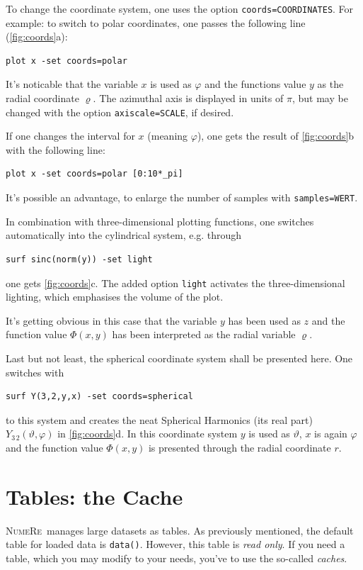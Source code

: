 \documentclass[DIV=14,headsepline,footsepline]{scrbook}
\newcommand{\NR}{\textsc{Nu\-me\-Re}}
\begin{document}
				To change the coordinate system, one uses the option \verb+coords=COORDINATES+. For example: to switch to polar coordinates, one passes the following line (\autoref{fig:coords}a):
				\begin{lstlisting}
plot x -set coords=polar
				\end{lstlisting}
				
				It's noticable that the variable $x$ is used as $\varphi$ and the functions value $y$ as the radial coordinate $\varrho$. The azimuthal axis is displayed in units of $\pi$, but may be changed with the option \verb+axiscale=SCALE+, if desired. 
				
				If one changes the interval for $x$ (meaning $\varphi$), one gets the result of \autoref{fig:coords}b with the following line:
				\begin{lstlisting}
plot x -set coords=polar [0:10*_pi]
				\end{lstlisting}
				It's possible an advantage, to enlarge the number of samples with \verb+samples=WERT+.
				
				In combination with three-dimensional plotting functions, one switches automatically into the cylindrical system, e.g. through
				\begin{lstlisting}
surf sinc(norm(y)) -set light
				\end{lstlisting}
				one gets \autoref{fig:coords}c. The added option \verb+light+ activates the three-dimensional lighting, which emphasises the volume of the plot.
				
				It's getting obvious in this case that the variable $y$ has been used as $z$ and the function value $\Phi(x,y)$ has been interpreted as the radial variable $\varrho$.
				
				Last but not least, the spherical coordinate system shall be presented here. One switches with
				\begin{lstlisting}
surf Y(3,2,y,x) -set coords=spherical
				\end{lstlisting}
				to this system and creates the neat Spherical Harmonics (its real part) $Y_{3\,2}(\vartheta,\varphi)$ in \autoref{fig:coords}d. In this coordinate system $y$ is used as $\vartheta$, $x$ is again $\varphi$ and the function value $\Phi(x,y)$ is presented through the radial coordinate $r$.
				
		\chapter{Tables: the Cache}
			\NR\ manages large datasets as tables. As previously mentioned, the default table for loaded data is \verb+data()+. However, this table is \emph{read only}. If you need a table, which you may modify to your needs, you've to use the so-called \emph{caches}.
\end{document}
